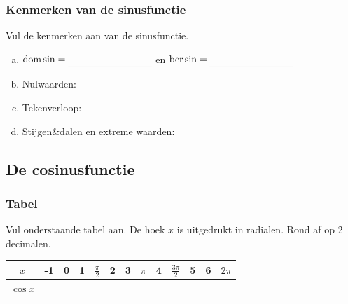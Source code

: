 \documentclass[a4paper,12pt]{article}
\begin{document}
\subsubsection{Kenmerken van de sinusfunctie}
\begin{oefening}
Vul de kenmerken aan van de sinusfunctie.
\begin{enumerate}[(a)]
  \item $\dom \sin=\arule{3cm}$ en $\ber \sin=\arule{3cm}$
  \item Nulwaarden:
  \item Tekenverloop: 
  \begin{center}
    \visgraad{10cm}
  \end{center}
  \item Stijgen\&dalen en extreme waarden:
  \begin{center}
    \visgraad{10cm}
  \end{center}
\end{enumerate}
\end{oefening}

\subsection{De cosinusfunctie}
\subsubsection{Tabel}
Vul onderstaande tabel aan. De hoek $x$ is uitgedrukt in radialen. Rond af op 2 decimalen.

\begin{adjustwidth}{-2.5cm}{-2.5cm}
\begin{center}
  \begin{tabular}{c|c|c|c|c|c|c|c|c|c|c|c|c}
    $x$ & -1 & 0 & 1 &  $\frac{\pi}{2}$ & 2 & 3 & $\pi$ & 4 & $\frac{3\pi}{2}$ & 5 & 6 & $2\pi$\\
    \hline
   $\cos x$ &\hspace*{0.5cm}&\hspace*{0.5cm}&\hspace*{0.5cm}&\hspace*{0.5cm}&\hspace*{0.5cm}&\hspace*{0.5cm}&\hspace*{0.5cm}&\hspace*{0.5cm}&\hspace*{0.5cm}&\hspace*{0.5cm}&\hspace*{0.5cm}&\hspace*{0.5cm}
  \end{tabular}
\end{center}
\end{adjustwidth}
\end{document}
